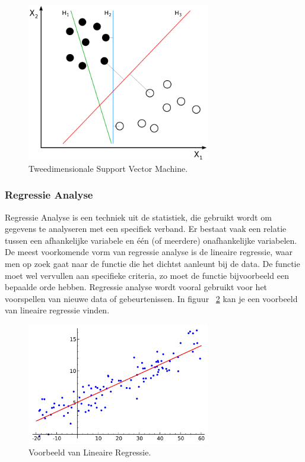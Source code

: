 	
	\begin{figure}
		\centering
		\includegraphics[width=80mm]{afbeeldingen/supportVectorMachines.PNG}
		\caption{Tweedimensionale Support Vector Machine.\citep{bron:supportvectormachines}}
		\label{fig:supportVectorMachines}
	\end{figure}
		
			
	\subsubsection{Regressie Analyse}
	Regressie Analyse is een techniek uit de statistiek\cite{sieben2009logistische}, die gebruikt wordt om gegevens te analyseren met een specifiek verband. Er bestaat vaak een relatie tussen een afhankelijke variabele en \'e\'en (of meerdere) onafhankelijke variabelen. De meest voorkomende vorm van regressie analyse is de lineaire regressie, waar men op zoek gaat naar de functie die het dichtst aanleunt bij de data. De functie moet wel vervullen aan specifieke criteria, zo moet de functie bijvoorbeeld een bepaalde orde hebben. Regressie analyse wordt vooral gebruikt voor het voorspellen van nieuwe data of gebeurtenissen. In figuur ~\ref{fig:regressieAnalyse} kan je een voorbeeld van lineaire regressie vinden.
	\begin{figure}
		\centering
		\includegraphics[width=80mm]{afbeeldingen/regressieAnalyse.PNG}
		\caption{Voorbeeld van Lineaire Regressie.\citep{bron:regressieanalyse} }
		\label{fig:regressieAnalyse}
		
	\end{figure}
	
